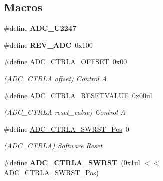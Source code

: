 \subsection*{Macros}
\begin{DoxyCompactItemize}
\item 
\hypertarget{group___s_a_m_l21___a_d_c_gada4493457ed8f90cd163b82f604d6e7e}{}\#define {\bfseries A\+D\+C\+\_\+\+U2247}\label{group___s_a_m_l21___a_d_c_gada4493457ed8f90cd163b82f604d6e7e}

\item 
\hypertarget{group___s_a_m_l21___a_d_c_gaa192aaf51cf256cf2d8a5e95601fdb0a}{}\#define {\bfseries R\+E\+V\+\_\+\+A\+D\+C}~0x100\label{group___s_a_m_l21___a_d_c_gaa192aaf51cf256cf2d8a5e95601fdb0a}

\item 
\hypertarget{group___s_a_m_l21___a_d_c_ga6ecd1e22b3acb8e29dbc4707a32dbbe7}{}\#define \hyperlink{group___s_a_m_l21___a_d_c_ga6ecd1e22b3acb8e29dbc4707a32dbbe7}{A\+D\+C\+\_\+\+C\+T\+R\+L\+A\+\_\+\+O\+F\+F\+S\+E\+T}~0x00\label{group___s_a_m_l21___a_d_c_ga6ecd1e22b3acb8e29dbc4707a32dbbe7}

\begin{DoxyCompactList}\small\item\em (A\+D\+C\+\_\+\+C\+T\+R\+L\+A offset) Control A \end{DoxyCompactList}\item 
\hypertarget{group___s_a_m_l21___a_d_c_ga3d883ad1cad4255a6d5d789742d28e9f}{}\#define \hyperlink{group___s_a_m_l21___a_d_c_ga3d883ad1cad4255a6d5d789742d28e9f}{A\+D\+C\+\_\+\+C\+T\+R\+L\+A\+\_\+\+R\+E\+S\+E\+T\+V\+A\+L\+U\+E}~0x00ul\label{group___s_a_m_l21___a_d_c_ga3d883ad1cad4255a6d5d789742d28e9f}

\begin{DoxyCompactList}\small\item\em (A\+D\+C\+\_\+\+C\+T\+R\+L\+A reset\+\_\+value) Control A \end{DoxyCompactList}\item 
\hypertarget{group___s_a_m_l21___a_d_c_gaf8ef9401077365b9f9fe6f89c96efab8}{}\#define \hyperlink{group___s_a_m_l21___a_d_c_gaf8ef9401077365b9f9fe6f89c96efab8}{A\+D\+C\+\_\+\+C\+T\+R\+L\+A\+\_\+\+S\+W\+R\+S\+T\+\_\+\+Pos}~0\label{group___s_a_m_l21___a_d_c_gaf8ef9401077365b9f9fe6f89c96efab8}

\begin{DoxyCompactList}\small\item\em (A\+D\+C\+\_\+\+C\+T\+R\+L\+A) Software Reset \end{DoxyCompactList}\item 
\hypertarget{group___s_a_m_l21___a_d_c_ga2b9532db668cf76f61d6feb59c9d8ab1}{}\#define {\bfseries A\+D\+C\+\_\+\+C\+T\+R\+L\+A\+\_\+\+S\+W\+R\+S\+T}~(0x1ul $<$$<$ A\+D\+C\+\_\+\+C\+T\+R\+L\+A\+\_\+\+S\+W\+R\+S\+T\+\_\+\+Pos)\label{group___s_a_m_l21___a_d_c_ga2b9532db668cf76f61d6feb59c9d8ab1}


\end{DoxyCompactItemize}
